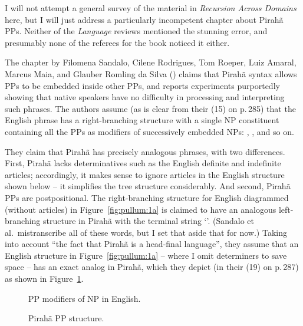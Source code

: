 \documentclass[output=paper,colorlinks,citecolor=brown
]{langscibook}
\begin{document}
I will not attempt a general survey of the material in
\textit{Recursion Across Domains} here, but I will just address a
particularly incompetent chapter about Pirah{\~a} PPs. Neither of
the \textit{Language} reviews mentioned the stunning error, and
presumably none of the referees for the book noticed it either.

The chapter by Filomena Sandalo, Cilene Rodrigues, Tom Roeper, Luiz Amaral,
Marcus Maia, and Glauber Romling da Silva (\citeyear{SandaloEtAl18})
claims that Pirah{\~a} syntax allows PPs to be embedded inside other PPs,
and reports experiments purportedly showing that native speakers have no
difficulty in processing and interpreting such phrases. The authors assume
(as is clear from their (15) on p.\,285) that the English phrase
 has a
right-branching structure with a single NP constituent containing
all the PPs as modifiers of successively embedded NPs:
,
, and so on.

They claim that Pirah{\~a} has precisely analogous phrases, with two
differences. First, Pirah{\~a} lacks determinatives such as the English
definite and indefinite articles; accordingly, it makes sense to ignore
articles in the English structure shown below -- it simplifies the tree
structure considerably.  And second, Pirah{\~a} PPs are postpositional.
The right-branching structure for English diagrammed (without articles)
in Figure~\ref{fig:pullum:1a} is claimed to have an analogous left-branching structure in
Pirah{\~a} with the terminal string `'. (Sandalo et al.\ mistranscribe all of these
words, but I set that aside that for now.) Taking into account ``the
fact that Pirah{\~a} is a head-final language'', they assume that an
English structure in Figure~\ref{fig:pullum:1a} -- where I omit determiners to save space
-- has an exact analog in Pirah{\~a}, which they depict
(in their (19) on p.\,287) as shown in Figure~\ref{fig:pullum:1b}.


\begin{figure}
\begin{floatrow}
        {\caption{PP modifiers of NP in English.}\label{fig:pullum:1a}}
        {\caption{ Pirahã PP structure.}\label{fig:pullum:1b}}
\end{floatrow}
\end{figure}
\end{document}
